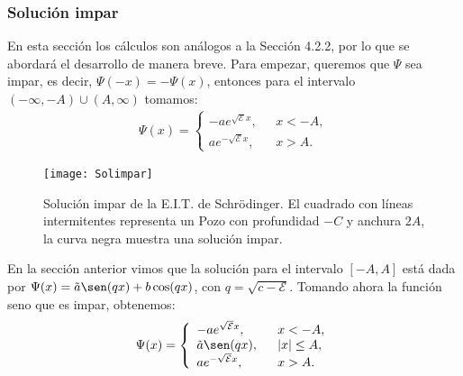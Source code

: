 \documentclass[12pt]{article}
\theoremstyle{definition}
\begin{document}
\subsubsection{Solución impar}
\noindent
En esta sección los cálculos son análogos a la Sección 4.2.2, por lo que se abordará el desarrollo de manera breve. Para empezar, queremos que $\Psi$ sea impar, es decir, $\Psi(-x) = -\Psi(x)$, entonces para el intervalo $(-\infty,-A)\cup(A,\infty)$ tomamos:
\begin{align*}
        \Psi(x) = 
        \left\{ \begin{array}{ll}
        -ae^{\sqrt{\mathcal{E}}x},& \:\:\:  x <- A,
        \\
        ae^{-\sqrt{\mathcal{E}}x},& \:\:\: x > A.
        \end{array}
        \right.
\end{align*}

\begin{figure}[h]
    \centering
    \texttt{[image: Solimpar]}
    \caption{Solución impar de la E.I.T. de Schrödinger. El cuadrado con líneas intermitentes representa un Pozo con profundidad $-C$ y anchura $2A$, la curva negra muestra una solución impar.} 
    \label{fig:Solimpar}
\end{figure}
\noindent
En la sección anterior vimos que la solución para el intervalo $[-A, A]$ está dada por $\Psi(x) = \Tilde{a}\sen(qx) + b\cos(qx)$, con $q = \sqrt{c-\mathcal{E}}$. Tomando ahora la función seno que es impar, obtenemos:
\begin{align}
        \Psi(x) = 
        \left\{ \begin{array}{ll}
        -ae^{\sqrt{\mathcal{E}}x},& \:\:\:  x < -A,
        \\
        \Tilde{a}\sen(qx), & \:\:\: |x| \leq A,
        \\
        ae^{-\sqrt{\mathcal{E}}x},& \:\:\: x > A.
        \end{array}
        \right.
        \label{eq:Solimpar}
\end{align}
\end{document}
